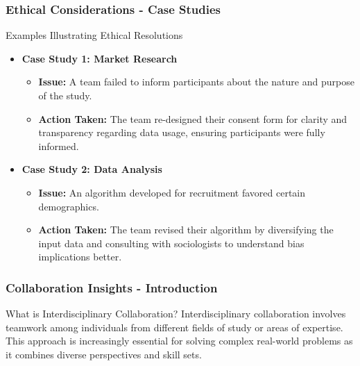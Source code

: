 \documentclass[aspectratio=169]{beamer}
\begin{document}
\begin{frame}[fragile]
    \frametitle{Ethical Considerations - Case Studies}
    \begin{block}{Examples Illustrating Ethical Resolutions}
        \begin{itemize}
            \item \textbf{Case Study 1: Market Research}
            \begin{itemize}
                \item \textbf{Issue:} A team failed to inform participants about the nature and purpose of the study.
                \item \textbf{Action Taken:} The team re-designed their consent form for clarity and transparency regarding data usage, ensuring participants were fully informed.
            \end{itemize}
            \item \textbf{Case Study 2: Data Analysis}
            \begin{itemize}
                \item \textbf{Issue:} An algorithm developed for recruitment favored certain demographics.
                \item \textbf{Action Taken:} The team revised their algorithm by diversifying the input data and consulting with sociologists to understand bias implications better.
            \end{itemize}
        \end{itemize}
    \end{block}
\end{frame}

\begin{frame}[fragile]
    \frametitle{Collaboration Insights - Introduction}
    \begin{block}{What is Interdisciplinary Collaboration?}
        Interdisciplinary collaboration involves teamwork among individuals from different fields of study or areas of expertise. 
        This approach is increasingly essential for solving complex real-world problems as it combines diverse perspectives and skill sets.
    \end{block}
\end{frame}
\end{document}
